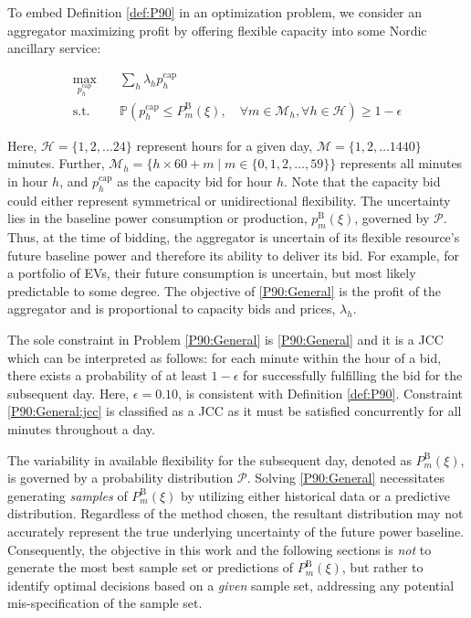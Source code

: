 \documentclass[conference]{IEEEtran}
\begin{document}
To embed Definition \ref{def:P90} in an optimization problem, we consider an aggregator maximizing profit by offering flexible capacity into some Nordic ancillary service:

\begin{subequations}\label{P90:General}
    \begin{align}
    \max_{p_{h}^{\text{cap}}} \quad & \sum_h \lambda_h p_{h}^{\text{cap}} \label{P90:General:obj}                                                                                                                                               \\
    \text{s.t.} \quad               & \mathbb{P}  \left( p_{h}^{\text{cap}} \leq P_{m}^{\text{B}}(\xi), \quad \forall{m} \in \mathcal{M}_{h},  \forall{h} \in \mathcal{H}  \right) \geq 1 - \epsilon \label{P90:General:jcc}
\end{align}    
\end{subequations}


Here, $\mathcal{H} = \{1, 2,  \ldots 24\}$ represent hours for a given day, $\mathcal{M} = \{1, 2,  \ldots 1440\}$ minutes. Further, $ \mathcal{M}_{h} = \{h \times 60 + m \mid m \in \{0, 1, 2, \ldots, 59\}\}$ represents all minutes in hour $h$, and $p_{h}^{\text{cap}}$ as the capacity bid for hour $h$. Note that the capacity bid could either represent symmetrical or unidirectional flexibility. The uncertainty lies in the baseline power consumption or production, $p_{m}^{\text{B}}(\xi)$, governed by $\mathcal{P}$. Thus, at the time of bidding, the aggregator is uncertain of its flexible resource's future baseline power and therefore its ability to deliver its bid. For example, for a portfolio of \acp{EV}, their future consumption is uncertain, but most likely predictable to some degree. The objective of \eqref{P90:General} is the profit of the aggregator and is proportional to capacity bids and prices, $\lambda_h$.

The sole constraint in Problem \eqref{P90:General} is \eqref{P90:General} and it is a \ac{JCC} which can be interpreted as follows: for each minute within the hour of a bid, there exists a probability of at least $1-\epsilon$ for successfully fulfilling the bid for the subsequent day. Here, $\epsilon = 0.10$, is consistent with Definition \ref{def:P90}. Constraint \eqref{P90:General:jcc} is classified as a \ac{JCC} as it must be satisfied concurrently for all minutes throughout a day.

The variability in available flexibility for the subsequent day, denoted as $P_{m}^{\text{B}}(\xi)$, is governed by a probability distribution $\mathcal{P}$. Solving \eqref{P90:General} necessitates generating \textit{samples} of $P_{m}^{\text{B}}(\xi)$ by utilizing either historical data or a predictive distribution. Regardless of the method chosen, the resultant distribution may not accurately represent the true underlying uncertainty of the future power baseline. Consequently, the objective in this work and the following sections is \textit{not} to generate the most best sample set or predictions of $P_{m}^{\text{B}}(\xi)$, but rather to identify optimal decisions based on a \textit{given} sample set, addressing any potential mis-specification of the sample set.
\end{document}
